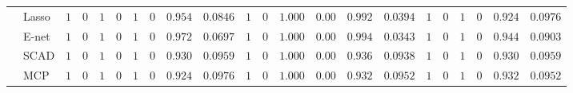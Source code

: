 \begin{tabular}{p{0.2cm}p{1cm}|p{0.6cm}p{0.6cm}|p{0.6cm}p{0.6cm}p{0.6cm}p{0.6cm}p{0.6cm}p{0.6cm}|p{0.6cm}p{0.6cm}p{0.6cm}p{0.6cm}p{0.6cm}p{0.6cm}|p{0.6cm}p{0.6cm}p{0.6cm}p{0.6cm}p{0.6cm}p{0.6cm}}
 & Lasso  & $1$ & $0$ & $1$ & $0$ & $1$ & $0$ & $0.954$ & $0.0846$ & $1$ & $0$ & $1.000$ & $0.00$ & $0.992$ & $0.0394$ & $1$ & $0$ & $1$ & $0$ & $0.924$ & $0.0976$ \\
 & E-net  & $1$ & $0$ & $1$ & $0$ & $1$ & $0$ & $0.972$ & $0.0697$ & $1$ & $0$ & $1.000$ & $0.00$ & $0.994$ & $0.0343$ & $1$ & $0$ & $1$ & $0$ & $0.944$ & $0.0903$ \\
 & SCAD  & $1$ & $0$ & $1$ & $0$ & $1$ & $0$ & $0.930$ & $0.0959$ & $1$ & $0$ & $1.000$ & $0.00$ & $0.936$ & $0.0938$ & $1$ & $0$ & $1$ & $0$ & $0.930$ & $0.0959$ \\
 & MCP  & $1$ & $0$ & $1$ & $0$ & $1$ & $0$ & $0.924$ & $0.0976$ & $1$ & $0$ & $1.000$ & $0.00$ & $0.932$ & $0.0952$ & $1$ & $0$ & $1$ & $0$ & $0.932$ & $0.0952$ \\
\hline 
\end{tabular}

